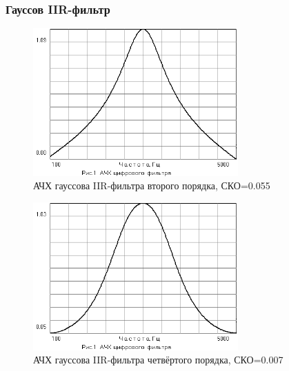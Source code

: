 \subsubsection{Гауссов IIR-фильтр}
\begin{figure}[H]
  \centering
  \includegraphics[width=0.7\textwidth]{data/Z1_GAUSS/gain_IIR_2p.png}
  \caption{АЧХ гауссова IIR-фильтра второго порядка, СКО=0.055}
  \label{fig:}
\end{figure}
\begin{figure}[H]
  \centering
  \includegraphics[width=0.7\textwidth]{data/Z1_GAUSS/gain_IIR_4p.png}
  \caption{АЧХ гауссова IIR-фильтра четвёртого порядка, СКО=0.007}
  \label{fig:}
\end{figure}




